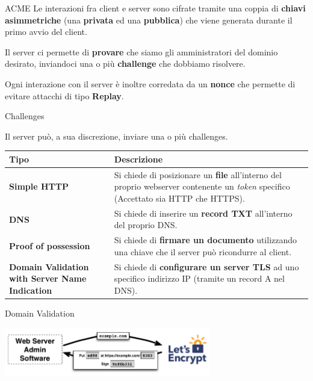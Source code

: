 \documentclass[xcolor=svgnames,11pt]{beamer}
\begin{document}
\begin{frame}{ACME}
Le interazioni fra client e server sono cifrate tramite una coppia di \textbf{chiavi asimmetriche}
(una \textbf{privata} ed una \textbf{pubblica}) che viene generata durante il primo avvio del client.

\medskip \pause

\begin{block}{}
Il server ci permette di \textbf{provare} che siamo gli amministratori del dominio desirato, inviandoci
una o più \textbf{challenge} che dobbiamo risolvere.
\end{block}

\medskip \pause

Ogni interazione con il server è inoltre corredata da un \textbf{nonce} che permette di evitare attacchi
di tipo \textbf{Replay}.

\end{frame}

\begin{frame}[fragile]{Challenges}
\begin{center}

Il server può, a sua discrezione, inviare una o più challenges.
\medskip\pause

\begin{tabular}{p{3cm}p{6cm}}

\hline
\textbf{Tipo} & \textbf{Descrizione} \\
\hline
\textcolor{leblue}{\textbf{\small Simple HTTP}} & \textcolor{leblue}{{\small Si chiede di posizionare un \textbf{file} all'interno del
 proprio webserver contenente un \emph{token} specifico (Accettato sia HTTP che HTTPS).}} \\
\hline
\textbf{\small DNS} & {\small Si chiede di inserire un \textbf{record TXT} all'interno del proprio DNS.} \\
\hline\hline
\textbf{\scriptsize Proof of possession} & {\scriptsize Si chiede di \textbf{firmare un documento} utilizzando una chiave
che il server può ricondurre al client.} \\
\hline
\textbf{\scriptsize Domain Validation with Server Name Indication} & {\scriptsize Si chiede di \textbf{configurare un server
TLS} ad uno specifico indirizzo IP (tramite un record A nel DNS).} \\
\hline
\end{tabular}
\end{center}
\end{frame}

\begin{frame}{Domain Validation}
\begin{center}
\includegraphics[width=9cm]{img/proto_1.png}
\end{center}
\end{frame}
\end{document}
